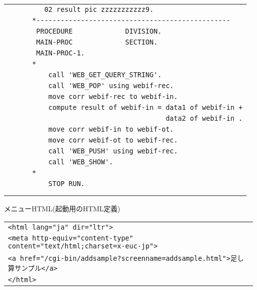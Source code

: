 {\begin{tabular}{|l|}
\vspace{-0.4em}\verb!         02 result pic zzzzzzzzzzz9.!\\
\vspace{-0.4em}\verb!      *------------------------------------------------!\\
\vspace{-0.4em}\verb!       PROCEDURE             DIVISION.!\\
\vspace{-0.4em}\verb!       MAIN-PROC             SECTION.!\\
\vspace{-0.4em}\verb!       MAIN-PROC-1.!\\
\vspace{-0.4em}\verb!      *!\\
\vspace{-0.4em}\verb!          call 'WEB_GET_QUERY_STRING'.!\\
\vspace{-0.4em}\verb!          call 'WEB_POP' using webif-rec.!\\
\vspace{-0.4em}\verb!          move corr webif-rec to webif-in.!\\
\vspace{-0.4em}\verb!          compute result of webif-in = data1 of webif-in +!\\
\vspace{-0.4em}\verb!                                       data2 of webif-in .!\\
\vspace{-0.4em}\verb!          move corr webif-in to webif-ot.!\\
\vspace{-0.4em}\verb!          move corr webif-ot to webif-rec.!\\
\vspace{-0.4em}\verb!          call 'WEB_PUSH' using webif-rec.!\\
\vspace{-0.4em}\verb!          call 'WEB_SHOW'.!\\
\vspace{-0.4em}\verb!      *!\\
\vspace{-0.4em}\verb!          STOP RUN.!\\
\vspace{-0.4em}\verb!!\\
\\
\hline
\end{tabular}
}

{\gt メニューHTML(起動用のHTML定義)}

\begin{tabular}{|l|}
\hline
\verb+<html lang="ja" dir="ltr">+\\
\verb+<meta http-equiv="content-type" content="text/html;charset=x-euc-jp">+\\
\verb+<a href="/cgi-bin/addsample?screenname=addsample.html">足し算サンプル</a>+\\
\verb+</html>+\\
\hline
\end{tabular}